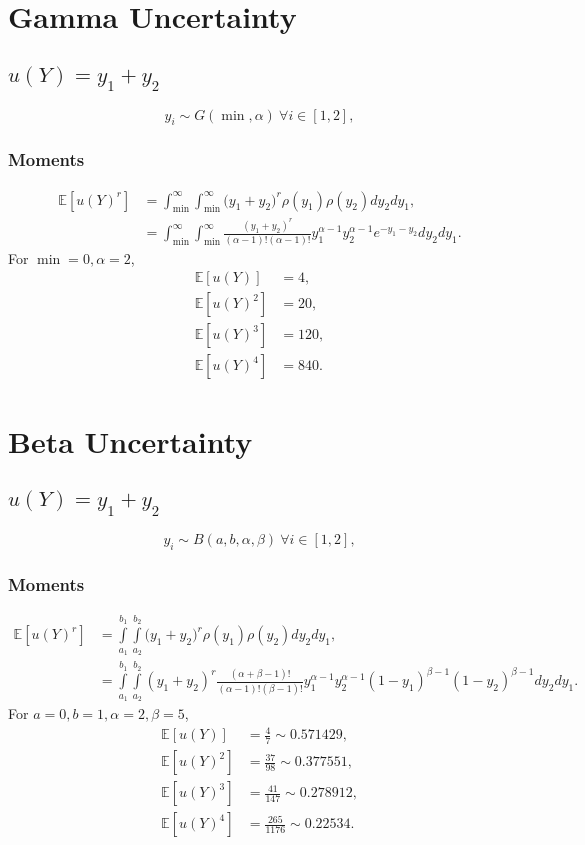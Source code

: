 \documentclass[11pt]{article}
\newcommand{\expv}[1]{\ensuremath{\mathbb{E}[ #1]}}
\newcommand{\intab}[1]{\ensuremath{\int\limits_{a_{#1}}^{b_#1}}}
\begin{document}
\section{Gamma Uncertainty}

\subsection{$u(Y)=y_1+y_2$}
\[y_i \sim G(\min,\alpha)\ \forall i\in[1,2],\]
\subsubsection{Moments}
\begin{align}
\expv{u(Y)^r}&=\int_{\min}^\infty\int_{\min}^\infty\Big(y_1+y_2\Big)^r\rho(y_1)\rho(y_2) dy_2 dy_1,\\
   &=\int_{\min}^\infty\int_{\min}^\infty \frac{(y_1+y_2)^r}{(\alpha-1)!(\alpha-1)!}y_1^{\alpha-1}y_2^{\alpha-1}e^{-y_1-y_2}dy_2 dy_1.
\end{align}
For $\min =0,\alpha=2$,
\begin{align}
  \expv{u(Y)} &= 4,\\
  \expv{u(Y)^2} &=20,\\
  \expv{u(Y)^3} &=120,\\
  \expv{u(Y)^4} &=840.
\end{align}

\section{Beta Uncertainty}

\subsection{$u(Y)=y_1+y_2$}
\[y_i \sim B(a,b,\alpha,\beta)\ \forall i\in[1,2],\]
\subsubsection{Moments}
\begin{align}
\expv{u(Y)^r}&=\intab{1}\intab{2}\Big(y_1+y_2\Big)^r\rho(y_1)\rho(y_2) dy_2 dy_1,\\
   &=\intab{1}\intab{2} (y_1+y_2)^r \frac{(\alpha+\beta-1)!}{(\alpha-1)!(\beta-1)!}   y_1^{\alpha-1}y_2^{\alpha-1}(1-y_1)^{\beta-1}(1-y_2)^{\beta-1}dy_2 dy_1.
\end{align}
For $a =0,b=1,\alpha=2,\beta=5$,
\begin{align}
  \expv{u(Y)} &= \frac{4}{7}\sim0.571429,\\
  \expv{u(Y)^2} &=\frac{37}{98}\sim0.377551,\\
  \expv{u(Y)^3} &=\frac{41}{147}\sim0.278912,\\
  \expv{u(Y)^4} &=\frac{265}{1176}\sim0.22534.
\end{align}
\end{document}

